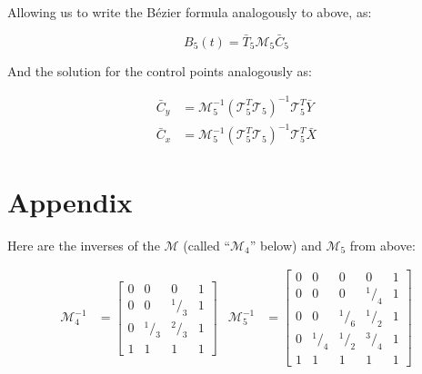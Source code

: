 \documentclass{article}
\newcommand{\lfrac}[2]{\ensuremath{^#1/_#2}}
\begin{document}
Allowing us to write the B\'ezier formula analogously to above, as:

\[B_5(t)=\bar{T}_5\mathcal{M}_5\bar{C}_5\]

And the solution for the control points analogously as:

\begin{align*}
  \bar{C}_y &= \mathcal{M}_5^{-1}(\mathcal{T}_5^T\mathcal{T}_5)^{-1}\mathcal{T}_5^T\bar{Y} \\
  \bar{C}_x &= \mathcal{M}_5^{-1}(\mathcal{T}_5^T\mathcal{T}_5)^{-1}\mathcal{T}_5^T\bar{X}
\end{align*}

\section{Appendix}

Here are the inverses of the $\mathcal{M}$ (called ``$\mathcal{M}_4$'' below) and $\mathcal{M}_5$ from above:

\begin{align*}
  \mathcal{M}_4^{-1} &= \left[\begin{array}{cccc}
    0 & 0 & 0 & 1 \\
    0 & 0 & \lfrac{1}{3} & 1 \\
    0 & \lfrac{1}{3} & \lfrac{2}{3} & 1 \\
    1 & 1 & 1 & 1
  \end{array}\right] &
  \mathcal{M}_5^{-1} &= \left[\begin{array}{ccccc}
  0 & 0 & 0 & 0 & 1 \\
  0 & 0 & 0 & \lfrac{1}{4} & 1 \\
  0 & 0 & \lfrac{1}{6} & \lfrac{1}{2} & 1 \\
  0 & \lfrac{1}{4} & \lfrac{1}{2} & \lfrac{3}{4} & 1 \\
  1 & 1 & 1 & 1 & 1
  \end{array}\right]
\end{align*}
\end{document}
